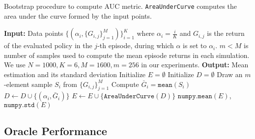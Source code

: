 \begin{algorithm}
\caption{Bootstrap procedure to compute AUC metric. \texttt{AreaUnderCurve} computes the area under the curve formed by the input points.}
\small
\label{alg:metric}
\begin{algorithmic}[1]  %
    \State \textbf{Input:} Data points $\{ (\alpha_i, \{G_{i,j}\}_{j = 1}^M) \}_{i = 1}^K$ where $\alpha_i = \frac{i}{K} $ and $G_{i, j}$ is the return of the evaluated policy in the $j$-th episode, during which $\alpha$ is set to $\alpha_i$. $m < M$ is number of samples used to compute the mean episode returns in each simulation. We use $N = 1000, K = 6, M = 1600, m = 256$ in our experiments.
    \State \textbf{Output:} Mean estimation and its standard deviation 
    \State Initialize $E = \emptyset$
    \State Initialize $D = \emptyset$
    \State Draw an $m$-element sample $S_i$ from $\{ G_{i, j} \}_{j = 1}^M$
    \State Compute $\bar G_{i} = \texttt{mean}(S_i)$
    \State $D \leftarrow D \cup \{(\alpha_i, \bar G_i)\}$
    \EndFor
    \State $E \leftarrow E \cup \{ \texttt{AreaUnderCurve}(D) \}$
    \EndFor
    \Return $\texttt{numpy.mean}(E)$, $\texttt{numpy.std}(E)$
\end{algorithmic}
\end{algorithm}


\subsection{Oracle Performance}
\label{sec:rl-oracle}

